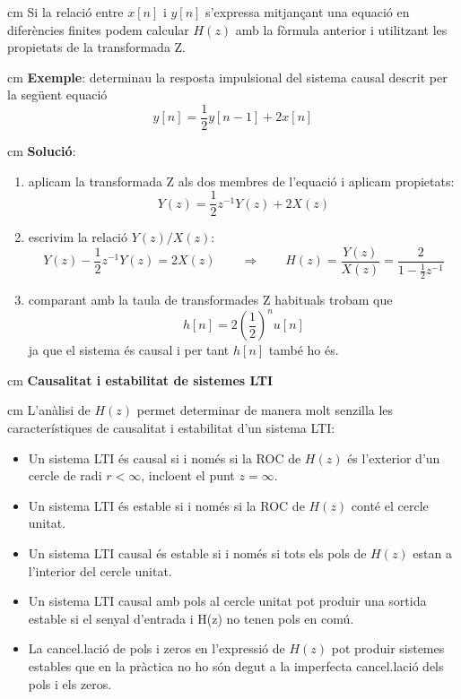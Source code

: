 \documentclass{article}
\begin{document}
 cm
\noindent
Si la relaci\'o entre $x[n]$ i $y[n]$ s'expressa mitjan\c{c}ant una equaci\'o en difer\`encies
finites podem calcular $H(z)$ amb la f\`ormula anterior i utilitzant les propietats de la transformada Z.

 cm
\noindent
\textbf{Exemple}: determinau la resposta impulsional del sistema causal descrit per la seg\"uent equaci\'o
\[
y[n]=\frac{1}{2}y[n-1]+2x[n]
\]

 cm
\noindent
\textbf{Soluci\'o}: 
\begin{enumerate}
\item aplicam la transformada Z als dos membres de l'equaci\'o i aplicam propietats:
\[
Y(z)=\frac{1}{2}z^{-1}Y(z)+2X(z)
\]
\item escrivim la relaci\'o $Y(z)/X(z)$:
\[
Y(z)-\frac{1}{2}z^{-1}Y(z)=2X(z) \qquad \Longrightarrow \qquad H(z)=\frac{Y(z)}{X(z)}=\frac{2}{1-\frac{1}{2}z^{-1}}
\]
\item comparant amb la taula de transformades Z habituals trobam que 
\[
h[n]=2(\frac{1}{2})^n u[n]
\]
\noindent
ja que el sistema \'es causal i per tant $h[n]$ tamb\'e ho \'es.
\end{enumerate}


 cm
\noindent
\textbf{Causalitat i estabilitat de sistemes LTI}

 cm
\noindent
L'an\`alisi de $H(z)$ permet determinar de manera molt senzilla les caracter\'istiques de
causalitat i estabilitat d'un sistema LTI:
\begin{itemize}
\item Un sistema LTI \'es causal si i nom\'es si la ROC de $H(z)$ \'es l'exterior d'un cercle de
radi $r < \infty$, incloent el punt $z=\infty$.
\item Un sistema LTI \'es estable si i nom\'es si la ROC de $H(z)$ cont\'e el cercle unitat.
\item Un sistema LTI causal \'es estable si i nom\'es si tots els pols de $H(z)$ estan a l'interior 
del cercle unitat. 
\item Un sistema LTI causal amb pols al cercle unitat pot produir una sortida estable 
si el senyal d'entrada i H(z) no tenen pols en com\'u. 
\item La cancel.laci\'o de pols i zeros en l'expressi\'o de $H(z)$ pot produir sistemes 
estables que en la pr\`actica no ho s\'on degut a la imperfecta cancel.laci\'o dels pols i els zeros.
\end{itemize}
 
\end{document}
